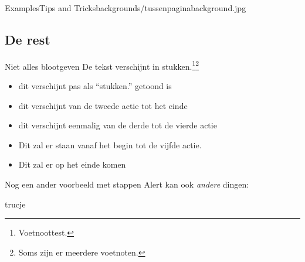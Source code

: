 \documentclass[department=softwarescience, notes={show notes}, slidesperpage=4, handout, official=true]{beamerruhuisstijl}
\begin{document}

\renewcommand{\dept}{cls}

\begin{tussenpagina}{Examples}{Tips and Tricks}{backgrounds/tussenpaginabackground.jpg}
\end{tussenpagina}
\note{}

\subsection{De rest}
\begin{frame}{Niet alles blootgeven}
    De \pause tekst \pause verschijnt \pause in \pause stukken.\footnote{Voetnoottest.}\footnote{Soms zijn er meerdere voetnoten.}

    \begin{itemize}
         \item<+-> dit verschijnt pas als ``stukken.'' getoond is
         \item<+-> dit verschijnt van de tweede actie tot het einde
         \item<+-+> dit verschijnt eenmalig van de derde tot de vierde actie
         \item<-+> Dit zal er staan vanaf het begin tot de vijfde actie.
         \item<+-> Dit zal er op het einde komen 
      \end{itemize}
\end{frame}

\begin{frame}{Nog een ander voorbeeld met stappen}
    Alert kan \alert<+->{ook}
    \emph<+->{andere} dingen:
     
    trucje
\end{frame}
\note{
    
}
\end{document}
